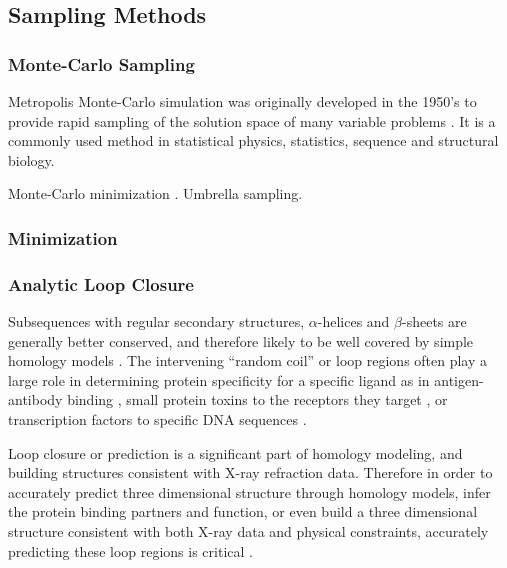 \subsection{Sampling Methods}
\label{subsection:sampling_methods}

\subsubsection{Monte-Carlo Sampling}
\label{subsubsection:monte_carlo}
Metropolis Monte-Carlo simulation was originally developed in the 1950's to provide rapid sampling of the solution space of many variable problems \cite{metropolis1953equation}.
\cite{hastings1970monte}
It is a commonly used method in statistical physics, statistics, sequence and structural biology.


Monte-Carlo minimization  \cite{li1987monte}.
Umbrella sampling\cite{torrie1977nonphysical}.

\subsubsection{Minimization}
\label{subsubsection:minimization}


\subsubsection{Analytic Loop Closure}
\label{subsubsection:analytic_loop_closure}
Subsequences with regular secondary structures, $\alpha$-helices and $\beta$-sheets are generally better conserved, and therefore likely to be well covered by simple homology models \cite{kolodny2005inverse}.
The intervening ``random coil'' or loop regions often play a large role in determining protein specificity for a specific ligand as in antigen-antibody binding \cite{bajorath1996comparison}, small protein toxins to the receptors they target \cite{wu1996functional}, or transcription factors to specific DNA sequences \cite{jones1999protein}.

Loop closure or prediction is a significant part of homology modeling, and building structures consistent with X-ray refraction data.
Therefore in order to accurately predict three dimensional structure through homology models, infer the protein binding partners and function, or even build a three dimensional structure consistent with both X-ray data and physical constraints, accurately predicting these loop regions is critical \cite{fiser2000modeling}.

